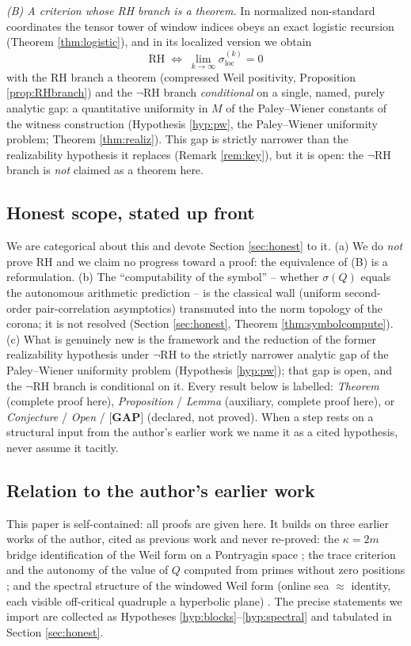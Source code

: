 \documentclass[11pt,reqno]{amsart}
\theoremstyle{definition}
\newcommand{\GAP}{\textbf{[GAP]}}
\begin{document}
\emph{(B) A criterion whose RH branch is a theorem.} In normalized
non-standard coordinates the tensor tower of window indices obeys an exact
logistic recursion (Theorem \ref{thm:logistic}), and in its localized version we
obtain
\[
\mathrm{RH}\;\Longleftrightarrow\;\lim_{k\to\infty}\sigma_{\mathrm{loc}}^{(k)}=0
\]
with the RH branch a theorem (compressed Weil positivity, Proposition
\ref{prop:RHbranch}) and the \(\neg\)RH branch \emph{conditional} on a single,
named, purely analytic gap: a quantitative uniformity in \(M\) of the
Paley--Wiener constants of the witness construction (Hypothesis \ref{hyp:pw},
the Paley--Wiener uniformity problem; Theorem \ref{thm:realiz}). This gap is strictly narrower than the
realizability hypothesis it replaces (Remark \ref{rem:key}), but it is open: the
\(\neg\)RH branch is \emph{not} claimed as a theorem here.

\subsection{Honest scope, stated up front}\label{subsec:honest-up-front}
We are categorical about this and devote Section \ref{sec:honest} to it. (a) We
do \emph{not} prove RH and we claim no progress toward a proof: the equivalence
of (B) is a reformulation. (b) The ``computability of the symbol'' -- whether
\(\sigma(Q)\) equals the autonomous arithmetic prediction -- is the classical
wall (uniform second-order pair-correlation asymptotics) transmuted into the
norm topology of the corona; it is not resolved (Section \ref{sec:honest},
Theorem \ref{thm:symbolcompute}). (c) What is genuinely new is the framework and
the reduction of the former realizability hypothesis under \(\neg\)RH to the
strictly narrower analytic gap of the Paley--Wiener uniformity problem (Hypothesis \ref{hyp:pw}); that
gap is open, and the \(\neg\)RH branch is conditional on it. Every result
below is labelled: \emph{Theorem} (complete proof here), \emph{Proposition} /
\emph{Lemma} (auxiliary, complete proof here), or \emph{Conjecture} / \emph{Open}
/ \(\GAP\) (declared, not proved). When a step rests on a structural input from
the author's earlier work we name it as a cited hypothesis, never assume it
tacitly.

\subsection{Relation to the author's earlier work}
This paper is self-contained: all proofs are given here. It builds on three
earlier works of the author, cited as previous work and never re-proved: the
\(\kappa=2m\) bridge identification of the Weil form on a Pontryagin space
\cite{P35}; the trace criterion and the autonomy of the value of \(Q\) computed
from primes without zero positions \cite{P39}; and the spectral structure of the
windowed Weil form (online sea \(\approx\) identity, each visible off-critical
quadruple a hyperbolic plane) \cite{P40}. The precise statements we import are
collected as Hypotheses \ref{hyp:blocks}--\ref{hyp:spectral} and tabulated in
Section \ref{sec:honest}.
\end{document}
